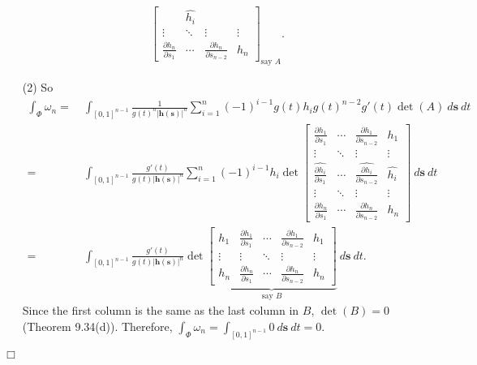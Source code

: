 \documentclass{article}
\begin{document}
\begin{enumerate}
\begin{align*}
{\begin{bmatrix}
        & \widehat{h_i} \\
      \vdots & \ddots & \vdots & \vdots \\
      \frac{\partial h_n}{\partial s_1}
        & \cdots
        & \frac{\partial h_n}{\partial s_{n-2}}
        & h_n
    \end{bmatrix}}_{\text{say $A$}}.
  \end{align*}
\item[(2)]
  So
  \begin{align*}
    \int_{\Phi} \omega_n
    =& \: \int_{[0,1]^{n-1}} \frac{1}{g(t)^{n}|\mathbf{h}(\mathbf{s})|^{n}}
      \sum_{i=1}^{n} (-1)^{i-1} g(t) h_i g(t)^{n-2} g'(t) \det(A) \: d\mathbf{s} \: dt \\
    =& \: \int_{[0,1]^{n-1}} \frac{g'(t)}{g(t)|\mathbf{h}(\mathbf{s})|^{n}}
      \sum_{i=1}^{n} (-1)^{i-1} h_i
      \det
      \begin{bmatrix}
        \frac{\partial h_1}{\partial s_1}
          & \cdots
          & \frac{\partial h_1}{\partial s_{n-2}}
          & h_1 \\
        \vdots & \ddots & \vdots & \vdots \\
        \widehat{\frac{\partial h_i}{\partial s_1}}
          & \cdots
          & \widehat{\frac{\partial h_i}{\partial s_{n-2}}}
          & \widehat{h_i} \\
        \vdots & \ddots & \vdots & \vdots \\
        \frac{\partial h_n}{\partial s_1}
          & \cdots
          & \frac{\partial h_n}{\partial s_{n-2}}
          & h_n
      \end{bmatrix}
      \: d\mathbf{s} \: dt \\
    =& \: \int_{[0,1]^{n-1}} \frac{g'(t)}{g(t)|\mathbf{h}(\mathbf{s})|^{n}}
      \det
      \underbrace{\begin{bmatrix}
        h_1
          & \frac{\partial h_1}{\partial s_1}
          & \cdots
          & \frac{\partial h_1}{\partial s_{n-2}}
          & h_1 \\
        \vdots & \vdots & \ddots & \vdots & \vdots \\
        h_n
          & \frac{\partial h_n}{\partial s_1}
          & \cdots
          & \frac{\partial h_n}{\partial s_{n-2}}
          & h_n
      \end{bmatrix}}_{\text{say $B$}}
      \: d\mathbf{s} \: dt.
  \end{align*}
  Since the first column is the same as the last column in $B$,
  $\det(B) = 0$ (Theorem 9.34(d)).
  Therefore, $\int_{\Phi} \omega_n = \int_{[0,1]^{n-1}} 0 \: d\mathbf{s} \: dt = 0$.
\end{enumerate}
$\Box$ \\
\end{document}
